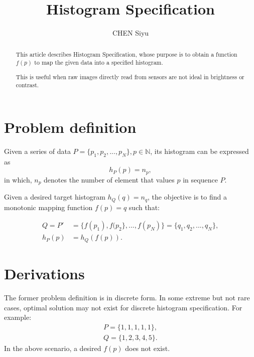 \documentclass[12pt]{article}
\title{Histogram Specification}
\author{CHEN Siyu}
\begin{document}
\maketitle




\begin{abstract}
This article describes Histogram Specification, whose purpose is to obtain a function $f(p)$ to map the given data into a specified histogram.

This is useful when raw images directly read from sensors are not ideal in brightness or contrast.
\end{abstract}


\section{Problem definition}

Given a series of data $P=\{p_1,p_2,...,p_N\}, p \in \mathbb{N}$, its histogram can be expressed as 
\begin{equation}
h_P(p)=n_p,
\end{equation}
in which, $n_p$ denotes the number of element that values $p$ in sequence $P$.

Given a desired target histogram $h_Q(q) = n_q$, the objective is to find a monotonic mapping function $f(p) = q$ such that:

\begin{align}
Q=P'&= \{f(p_1),f(p_2\},...,f(p_N) \} = \{q_1,q_2,...,q_N\}, \\
h_{P}(p) &=h_{Q}(f(p)). 
\end{align}

\section{Derivations}
The former problem definition is in discrete form. In some extreme but not rare cases, optimal solution may not exist for discrete histogram specification. For example:
\begin{align}
P=\{1,1,1,1,1\}, \\ 
Q=\{1,2,3,4,5\}.
\end{align}
In the above scenario, a desired $f(p)$ does not exist.
\end{document}
